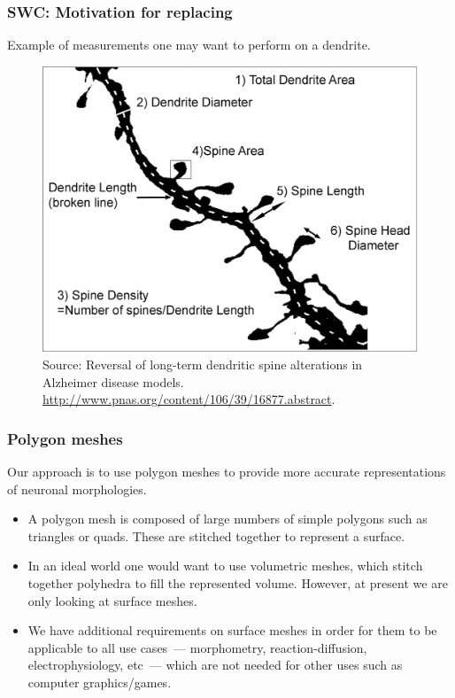 \documentclass{beamer}
\begin{document}
\begin{frame}
\frametitle{SWC: Motivation for replacing}

Example of measurements one may want to perform on a dendrite.

\begin{figure}[H]
    \centering
    \includegraphics[scale=0.1]{../blog/images/F1_large}
    \caption{Source: Reversal of long-term dendritic spine alterations in Alzheimer disease models.
      \url{http://www.pnas.org/content/106/39/16877.abstract}.}
    \label{fig:morphometry}
\end{figure}

\end{frame}

\begin{frame}
\frametitle{Polygon meshes}

Our approach is to use polygon meshes to provide more accurate
representations of neuronal morphologies.

\pause

\begin{itemize}
\item A polygon mesh is composed of large numbers of simple polygons
  such as triangles or quads. These are stitched together to represent
  a surface.
\pause
\item In an ideal world one would want to use volumetric meshes, which
  stitch together polyhedra to fill the represented volume. However,
  at present we are only looking at surface meshes.
\pause
\item We have additional requirements on surface meshes in order for
  them to be applicable to all use cases~--- morphometry,
  reaction-diffusion, electrophysiology, etc~--- which are not needed
  for other uses such as computer graphics/games.
\end{itemize}

\end{frame}
\end{document}
